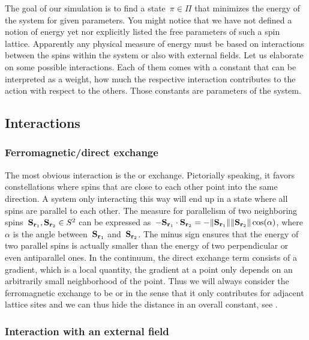 The goal of our simulation is to find a state~$\pi \in \Pi$ that minimizes the
energy of the system for given parameters. You might notice that we have not
defined a notion of energy yet nor explicitly listed the free parameters of such
a spin lattice. Apparently any physical measure of energy must be based on
interactions between the spins within the system or also with external fields.
Let us elaborate on some possible interactions. Each of them comes with a
constant that can be interpreted as a weight, \ie{} how much the respective
interaction contributes to the action with respect to the others. Those
constants are parameters of the system.

\subsection{Interactions}

\subsubsection{Ferromagnetic/direct exchange}

The most obvious interaction is the  or 
exchange.  Pictorially speaking, it favors constellations where spins that are
close to each other point into the same direction. A system only interacting
this way will end up in a state where all spins are parallel to each other. The
measure for parallelism of two neighboring spins~$\mathbf{S}_{\mathbf{r}_1}, \mathbf{S}_{\mathbf{r}_2} \in S^2$
can be expressed as~$- \S_{\r_1} \cdot \S_{\r_2} = - \norm{\S_{\r_1}}
\norm{\S_{\r_2}} \cos(\alpha)$, where~$\alpha$ is the angle between~$\mathbf{S}_{\mathbf{r}_1}$
and~$\mathbf{S}_{\mathbf{r}_2}$. The minus sign ensures that the energy of two parallel spins is
actually smaller than the energy of two perpendicular or even antiparallel ones.
In the continuum, the direct exchange term consists of a gradient, which is a
local quantity, \ie{} the gradient at a point only depends on an arbitrarily
small neighborhood of the point. Thus we will always consider the ferromagnetic
exchange to be  or  in the sense that it
only contributes for adjacent lattice sites and we can thus hide the distance in
an overall constant, see .

\subsubsection{Interaction with an external field}

